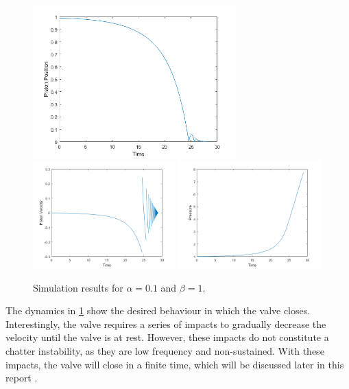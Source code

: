 \begin{figure}[!ht]
    \centering
    \includegraphics[width=0.7\textwidth]{Figures/Example/PositionTimeTrajectory.png}
    \includegraphics[width=0.49\textwidth]{Figures/Example/VelocityTimeTrajectory.png}
    \includegraphics[width=0.49\textwidth]{Figures/Example/PressureTimeTrajectory.png}
    \caption{Simulation results for $\alpha = 0.1$ and $\beta = 1$.}
    \label{fig:TimeTrajec}
\end{figure}

The dynamics in \cref{fig:TimeTrajec} show the desired behaviour in which the valve closes. Interestingly, the valve requires a series of impacts to gradually decrease the velocity until the valve is at rest. However, these impacts do not constitute a chatter instability, as they are low frequency and non-sustained. With these impacts, the valve will close in a finite time, which will be discussed later in this report%
.

